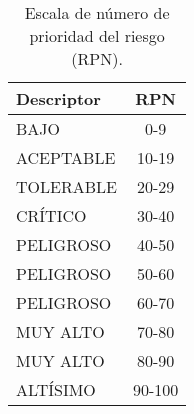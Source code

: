 \begin{table}[htbp]
	\caption{Escala de número de prioridad del riesgo (RPN).}
	\label{tab:rpn}
	\centering
	\begin{tabular}{lc}
		\hline
		\textbf{Descriptor} & \textbf{RPN} \\
		\hline
		BAJO & \cellcolor{GreenColor}0-9 \\
		ACEPTABLE & \cellcolor{GreenColor!50}10-19 \\
		TOLERABLE & \cellcolor{GreenColor!30}20-29 \\
		\hline
		CRÍTICO & \cellcolor{LightRed}30-40 \\
		PELIGROSO & \cellcolor{RedColor!50}40-50 \\
		PELIGROSO  & \cellcolor{RedColor!60}50-60 \\	
		PELIGROSO  & \cellcolor{RedColor!70}60-70 \\
		MUY ALTO & \cellcolor{RedColor!80}70-80 \\
		MUY ALTO & \cellcolor{RedColor!90}80-90 \\
		ALTÍSIMO & \cellcolor{RedColor}90-100 \\
		\hline
	\end{tabular}
\end{table}

